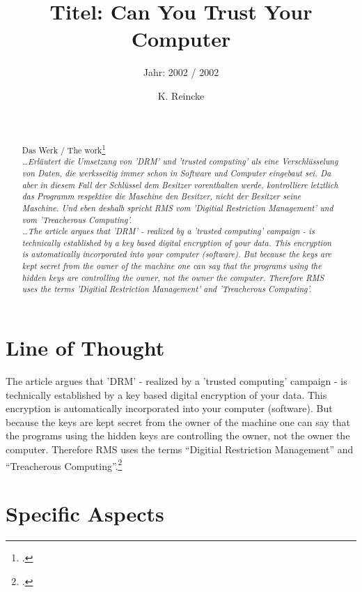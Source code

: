 \documentclass[DIV=calc,BCOR=5mm,11pt,headings=small,oneside,abstract=true, toc=bib]{scrartcl}
\begin{document}

\titlehead{Literaturexzerpt}
\subject{Autor(en): Stallman / Stallman2002b}
\title{Titel: Can You Trust Your Computer}
\subtitle{Jahr: 2002 / 2002 }
\author{K. Reincke}

\maketitle

\begin{abstract}
\noindent
\cite[(in:)][]{StaGay2002a} \\
\noindent
\cite[(ist:)][]{Stallman2002b} \\
Das Werk / The work\footcite[][]{Stallman2002b} \\
\noindent \itshape
\ldots Erläutert die Umsetzung von 'DRM' und 'trusted computing' als eine
Verschlüsselung von Daten, die werksseitig immer schon in Software und Computer
eingebaut sei. Da aber in diesem Fall der Schlüssel dem Besitzer vorenthalten
werde, kontrolliere letztlich das Programm respektive die Maschine den Besitzer,
nicht der Besitzer seine Maschine. Und eben deshalb spricht RMS vom 'Digitial
Restriction Management' und vom 'Treacherous Computing'.
\\
\noindent
\ldots The article argues that 'DRM' - realized by a 'trusted computing'
campaign - is technically established by a key based digital encryption of your
data. This encryption is automatically incorporated into your computer
(software). But because the keys are kept secret from the owner of the machine
one can say that the programs using the hidden keys are controlling the owner,
not the owner the computer. Therefore RMS uses the terms 'Digitial Restriction
Management' and 'Treacherous Computing'.
\end{abstract}
\footnotesize
\normalsize

\section{Line of Thought}

The article argues that 'DRM' - realized by a 'trusted computing' campaign - is
technically established by a key based digital encryption of your data. This
encryption is automatically incorporated into your computer (software). But
because the keys are kept secret from the owner of the machine one can say that
the programs using the hidden keys are controlling the owner, not the owner the
computer. Therefore RMS uses the terms ``Digitial Restriction Management'' and
``Treacherous Computing''.\footcite[cf][115]{Stallman2002b}
\section{Specific Aspects}

\small

\end{document}
